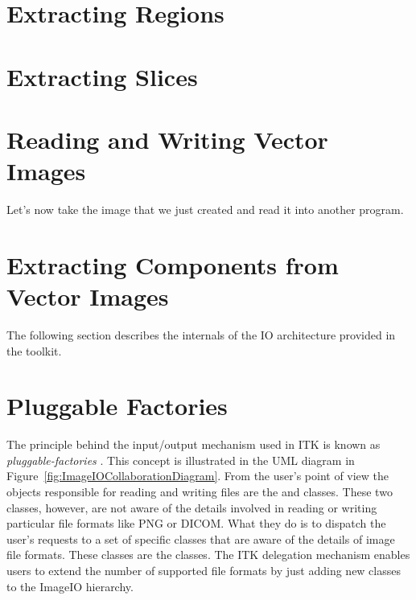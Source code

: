 \section{Extracting Regions}
\label{sec:ImagReadRegionOfInterestWrite}


\section{Extracting Slices}
\label{sec:ImagReadExtractWrite}






\section{Reading and Writing Vector Images}
\label{sec:VectorImagReadWrite}



Let's now take the image that we just created and read it into another program.




\section{Extracting Components from Vector Images}
\label{sec:VectorImageExtractComponent}




The following section describes the internals of the IO architecture provided
in the toolkit.

\section{Pluggable Factories}
\label{sec:ImageIOPluggableFactories}

The principle behind the input/output mechanism used in ITK is known as
\emph{pluggable-factories} \cite{Gamma1995}. This concept is illustrated in
the UML diagram in Figure~\ref{fig:ImageIOCollaborationDiagram}. From the
user's point of view the objects responsible for reading and writing files
are the  and 
classes. These two classes, however, are not aware of the details involved in
reading or writing particular file formats like PNG or DICOM.  What they do
is to dispatch the user's requests to a set of specific classes that are
aware of the details of image file formats. These classes are the
 classes. The ITK delegation mechanism enables users to
extend the number of supported file formats by just adding new classes to the
ImageIO hierarchy.

